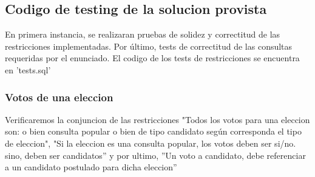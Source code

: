\subsection{Codigo de testing de la solucion provista}

En primera instancia, se realizaran pruebas de solidez y correctitud de las restricciones implementadas. Por último, tests de correctitud de las consultas requeridas por el enunciado. El codigo de los tests de restricciones se encuentra en 'tests.sql'

\subsubsection{Votos de una eleccion}

Verificaremos la conjuncion de las restricciones "Todos los votos para una eleccion son: o bien consulta popular o bien de tipo candidato según corresponda el tipo de eleccion",  "Si la eleccion es una consulta popular, los votos deben ser si/no. sino, deben ser candidatos'' y por ultimo, ''Un voto a candidato, debe referenciar a un candidato postulado para dicha eleccion''

